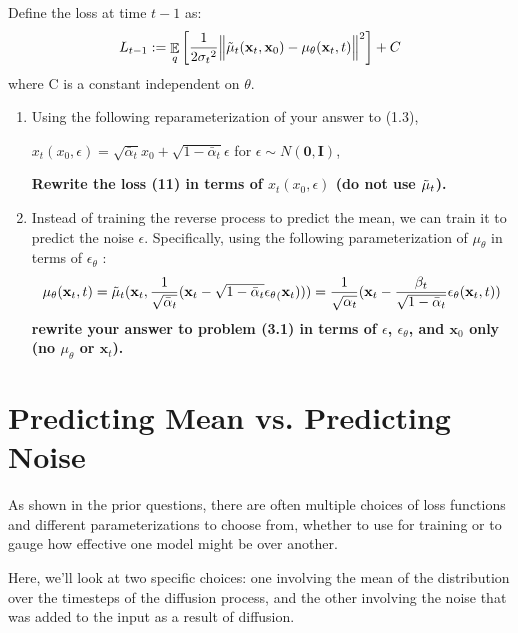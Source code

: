 \documentclass{article}
\DeclareMathOperator{\EX}{\mathbb{E}}%
\begin{document}
Define the loss at time $t-1$ as:
\begin{equation}
    L_{t-1} := \EX_q\left[\frac{1}{2{\sigma_t}^2}
    \Big\lVert {\Tilde\mu_t}(\textbf{x}_t, \textbf{x}_0) - {\mu_\theta}(\textbf{x}_t, t)\Big\rVert^2\right] + C
\end{equation}
where C is a constant independent on $\theta$. 

\begin{enumerate}
    \item 
    Using the following reparameterization of your answer to (1.3), 
    
    ${x_t}(x_0, \epsilon) = \sqrt{\bar\alpha_t}x_0 + \sqrt{1 - \bar\alpha_t}\epsilon $  for $\epsilon \sim N(\boldsymbol{0}, \boldsymbol{I})$, 
    
    \textbf{Rewrite the loss (11) in terms of ${x_t}(x_0, \epsilon)$ (do not use $\Tilde\mu_t$).}

    \item 
    Instead of training the reverse process to predict the mean, we can train it to predict the noise $\epsilon$. Specifically, using the following parameterization of $\mu_\theta$ in terms of $\epsilon_\theta$ :
    \begin{equation}
        {\mu_\theta}(\textbf{x}_t, t) = {{\Tilde\mu}_t}(\textbf{x}_t, \frac{1}{\sqrt{{\bar\alpha}_t}}(\textbf{x}_t - \sqrt{1 - {\bar\alpha}_t}{\epsilon_\theta}_(\textbf{x}_t))) = \frac{1}{\sqrt{\alpha_t}}(\textbf{x}_t - \frac{\beta_t}{\sqrt{1 - {\bar\alpha}_t}}{\epsilon_\theta}(\textbf{x}_t, t))
    \end{equation}
    \textbf{rewrite your answer to problem (3.1) in terms of  $\epsilon$, $\epsilon_\theta$, and $\textbf{x}_0$ only (no $\mu_\theta$ or $\textbf{x}_t$).}

\end{enumerate}



\section{Predicting Mean vs. Predicting Noise}

As shown in the prior questions, there are often multiple choices of loss functions and different parameterizations to choose from, whether to use for training or to gauge how effective one model might be over another.

Here, we'll look at two specific choices: one involving the mean of the distribution over the timesteps of the diffusion process, and the other involving the noise that was added to the input as a result of diffusion.
\end{document}
